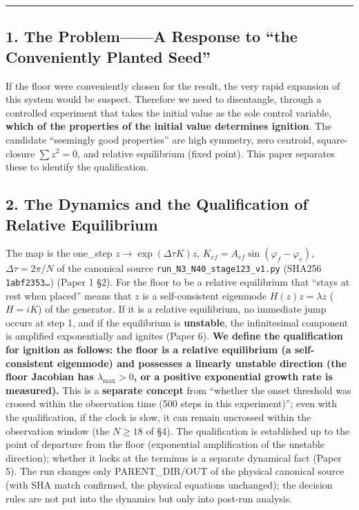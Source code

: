 \documentclass[
  a4paper,
]{ltjsarticle}
\begin{document}
\begin{center}\rule{0.5\linewidth}{0.5pt}\end{center}

\subsection{1. The Problem------A Response to ``the Conveniently Planted
Seed''}\label{the-problema-response-to-the-conveniently-planted-seed}

If the floor were conveniently chosen for the result, the very rapid
expansion of this system would be suspect. Therefore we need to
disentangle, through a controlled experiment that takes the initial
value as the sole control variable, \textbf{which of the properties of
the initial value determines ignition}. The candidate ``seemingly good
properties'' are high symmetry, zero centroid, square-closure
\(\sum z^2=0\), and relative equilibrium (fixed point). This paper
separates these to identify the qualification.

\subsection{2. The Dynamics and the Qualification of Relative
Equilibrium}\label{the-dynamics-and-the-qualification-of-relative-equilibrium}

The map is the one\_step \(z\to\exp(\Delta\tau K)z\),
\(K_{ef}=A_{ef}\sin(\varphi_f-\varphi_e)\), \(\Delta\tau=2\pi/N\) of the
canonical source \texttt{run\_N3\_N40\_stage123\_v1.py} (SHA256
\texttt{1abf2353…}) (Paper 1 §2). For the floor to be a relative
equilibrium that ``stays at rest when placed'' means that \(z\) is a
self-consistent eigenmode \(H(z)z=\lambda z\) (\(H=iK\)) of the
generator. If it is a relative equilibrium, no immediate jump occurs at
step 1, and if the equilibrium is \textbf{unstable}, the infinitesimal
component is amplified exponentially and ignites (Paper 6). \textbf{We
define the qualification for ignition as follows: the floor is a
relative equilibrium (a self-consistent eigenmode) and possesses a
linearly unstable direction (the floor Jacobian has
\(\lambda_{\max}>0\), or a positive exponential growth rate is
measured).} This is a \textbf{separate concept} from ``whether the onset
threshold was crossed within the observation time (500 steps in this
experiment)''; even with the qualification, if the clock is slow, it can
remain uncrossed within the observation window (the \(N\ge18\) of §4).
The qualification is established up to the point of departure from the
floor (exponential amplification of the unstable direction); whether it
locks at the terminus is a separate dynamical fact (Paper 5). The run
changes only PARENT\_DIR/OUT of the physical canonical source (with SHA
match confirmed, the physical equations unchanged); the decision rules
are not put into the dynamics but only into post-run analysis.
\end{document}
